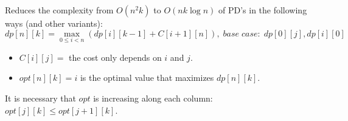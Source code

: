 Reduces the complexity from $O(n^2k)$ to $O(nk\log n)$ of PD's in the following ways (and other variants):
\begin{equation}
  dp[n][k] = \max_{0 \leq i < n}(dp[i][k-1] + C[i+1][n]), \; base \; case: \; dp[0][j], dp[i][0]
\end{equation}
\begin{itemize}
  \itemsep0em
  \item $C[i][j] = $ the cost only depends on $i$ and $j$.
  \item $opt[n][k] = i$ is the optimal value that maximizes $dp[n][k]$.
\end{itemize}
It is necessary that $opt$ is increasing along each column: $opt[j][k] \leq opt[j+1][k]$.